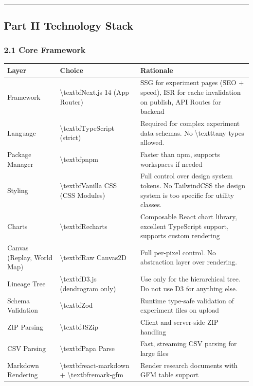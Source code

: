 \documentclass[11pt,a4paper]{article}
\begin{document}
\noindent\rule{\textwidth}{0.4pt}

\subsection*{Part II  Technology Stack}

\subsubsection*{2.1 Core Framework}

\begin{longtable}{lll}
\toprule
Layer & Choice & Rationale \\
\midrule
\endhead
Framework & \textbackslash{}textbf{Next.js 14} (App Router) & SSG for experiment pages (SEO + speed), ISR for cache invalidation on publish, API Routes for backend \\
Language & \textbackslash{}textbf{TypeScript} (strict) & Required for complex experiment data schemas. No \textbackslash{}texttt{any} types allowed. \\
Package Manager & \textbackslash{}textbf{pnpm} & Faster than npm, supports workspaces if needed \\
Styling & \textbackslash{}textbf{Vanilla CSS} (CSS Modules) & Full control over design system tokens. No TailwindCSS  the design system is too specific for utility classes. \\
Charts & \textbackslash{}textbf{Recharts} & Composable React chart library, excellent TypeScript support, supports custom rendering \\
Canvas (Replay, World Map) & \textbackslash{}textbf{Raw Canvas2D} & Full per-pixel control. No abstraction layer over rendering. \\
Lineage Tree & \textbackslash{}textbf{D3.js} (dendrogram only) & Use only for the hierarchical tree. Do not use D3 for anything else. \\
Schema Validation & \textbackslash{}textbf{Zod} & Runtime type-safe validation of experiment files on upload \\
ZIP Parsing & \textbackslash{}textbf{JSZip} & Client and server-side ZIP handling \\
CSV Parsing & \textbackslash{}textbf{Papa Parse} & Fast, streaming CSV parsing for large files \\
Markdown Rendering & \textbackslash{}textbf{react-markdown} + \textbackslash{}textbf{remark-gfm} & Render research documents with GFM table support \\
\bottomrule
\end{longtable}
\end{document}
